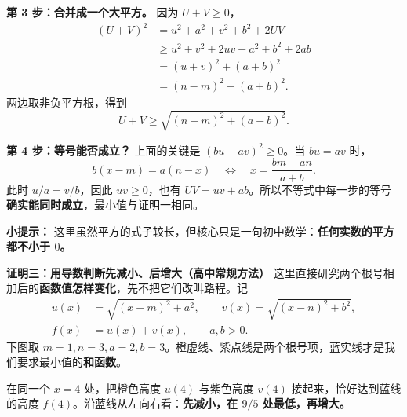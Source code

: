 \begin{proofbox}
\textbf{第 3 步：合并成一个大平方。} 因为 $U+V\geq0$，
\[
 \begin{aligned}
 (U+V)^2
 &=u^2+a^2+v^2+b^2+2UV\\
 &\geq u^2+v^2+2uv+a^2+b^2+2ab\\
 &=(u+v)^2+(a+b)^2\\
 &=(n-m)^2+(a+b)^2.
 \end{aligned}
\]
两边取非负平方根，得到
\[
 \boxed{U+V\geq\sqrt{(n-m)^2+(a+b)^2}}.
\]

\textbf{第 4 步：等号能否成立？} 上面的关键是 $(bu-av)^2\geq0$。当 $bu=av$ 时，
\[
 b(x-m)=a(n-x)
 \quad\Longleftrightarrow\quad
 x=\frac{bm+an}{a+b}.
\]
此时 $u/a=v/b$，因此 $uv\geq0$，也有 $UV=uv+ab$。所以不等式中每一步的等号\textbf{确实能同时成立}，最小值与证明一相同。

\textbf{小提示：} 这里虽然平方的式子较长，但核心只是一句初中数学：\textbf{任何实数的平方都不小于 $0$。}

\medskip
\end{proofbox}
\clearpage
\begin{proofbox}
\textbf{\textcolor{CProof}{证明三：用导数判断先减小、后增大（高中常规方法）}}
这里直接研究两个根号相加后的\textbf{函数值怎样变化}，先不把它们改叫路程。记
\[
\begin{aligned}
 u(x)&=\sqrt{(x-m)^2+a^2},\qquad
 v(x)=\sqrt{(x-n)^2+b^2},\\
 f(x)&=u(x)+v(x),\qquad a,b>0.
\end{aligned}
\]
下图取 $m=1,n=3,a=2,b=3$。橙虚线、紫点线是两个根号项，蓝实线才是我们要求最小值的\textbf{和函数}。


在同一个 $x=4$ 处，把橙色高度 $u(4)$ 与紫色高度 $v(4)$ 接起来，恰好达到蓝线的高度 $f(4)$。沿蓝线从左向右看：\textbf{先减小，在 $9/5$ 处最低，再增大。}
\end{proofbox}
\clearpage
